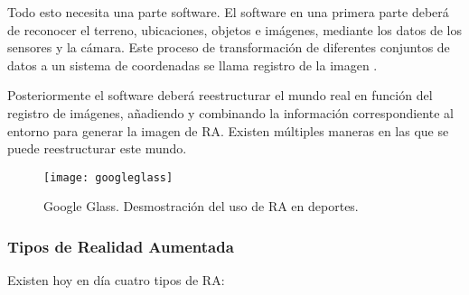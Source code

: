 Todo esto necesita una parte software. El software en una primera parte deberá de reconocer el terreno, ubicaciones, objetos e imágenes, mediante los datos de los sensores y la cámara. Este proceso de transformación de diferentes conjuntos de datos a un sistema de coordenadas se llama registro de la imagen \cite{URL::ImageRegister}. 

Posteriormente el software deberá reestructurar el mundo real en función del registro de imágenes, añadiendo y combinando la información correspondiente al entorno para generar la imagen de RA. Existen múltiples maneras en las que se puede reestructurar este mundo. 

\begin{figure}[h]
    \centering
    \texttt{[image: googleglass]}
    \caption{Google Glass. Desmostración del uso de RA en deportes.}
    \label{fig:googleglass}
\end{figure}

\subsubsection{Tipos de Realidad Aumentada}

Existen hoy en día cuatro tipos de RA:

